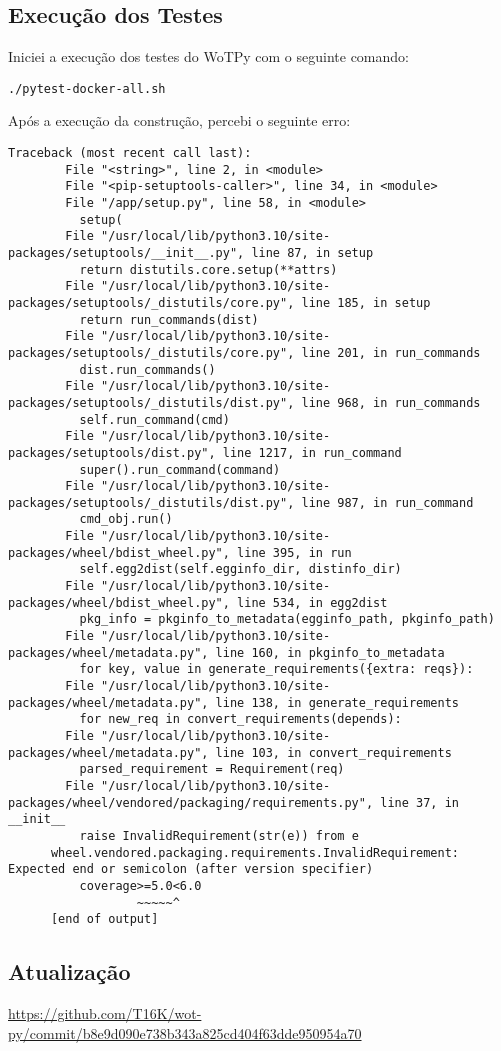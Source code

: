 \subsection{Execução dos Testes}

Iniciei a execução dos testes do WoTPy com o seguinte comando:

\begin{verbatim}
./pytest-docker-all.sh
\end{verbatim}

Após a execução da construção, percebi o seguinte erro:

\begin{lstlisting}[breaklines]
Traceback (most recent call last):
        File "<string>", line 2, in <module>
        File "<pip-setuptools-caller>", line 34, in <module>
        File "/app/setup.py", line 58, in <module>
          setup(
        File "/usr/local/lib/python3.10/site-packages/setuptools/__init__.py", line 87, in setup
          return distutils.core.setup(**attrs)
        File "/usr/local/lib/python3.10/site-packages/setuptools/_distutils/core.py", line 185, in setup
          return run_commands(dist)
        File "/usr/local/lib/python3.10/site-packages/setuptools/_distutils/core.py", line 201, in run_commands
          dist.run_commands()
        File "/usr/local/lib/python3.10/site-packages/setuptools/_distutils/dist.py", line 968, in run_commands
          self.run_command(cmd)
        File "/usr/local/lib/python3.10/site-packages/setuptools/dist.py", line 1217, in run_command
          super().run_command(command)
        File "/usr/local/lib/python3.10/site-packages/setuptools/_distutils/dist.py", line 987, in run_command
          cmd_obj.run()
        File "/usr/local/lib/python3.10/site-packages/wheel/bdist_wheel.py", line 395, in run
          self.egg2dist(self.egginfo_dir, distinfo_dir)
        File "/usr/local/lib/python3.10/site-packages/wheel/bdist_wheel.py", line 534, in egg2dist
          pkg_info = pkginfo_to_metadata(egginfo_path, pkginfo_path)
        File "/usr/local/lib/python3.10/site-packages/wheel/metadata.py", line 160, in pkginfo_to_metadata
          for key, value in generate_requirements({extra: reqs}):
        File "/usr/local/lib/python3.10/site-packages/wheel/metadata.py", line 138, in generate_requirements
          for new_req in convert_requirements(depends):
        File "/usr/local/lib/python3.10/site-packages/wheel/metadata.py", line 103, in convert_requirements
          parsed_requirement = Requirement(req)
        File "/usr/local/lib/python3.10/site-packages/wheel/vendored/packaging/requirements.py", line 37, in __init__
          raise InvalidRequirement(str(e)) from e
      wheel.vendored.packaging.requirements.InvalidRequirement: Expected end or semicolon (after version specifier)
          coverage>=5.0<6.0
                  ~~~~~^
      [end of output]
\end{lstlisting}

\subsection{Atualização}

\url{https://github.com/T16K/wot-py/commit/b8e9d090e738b343a825cd404f63dde950954a70}
